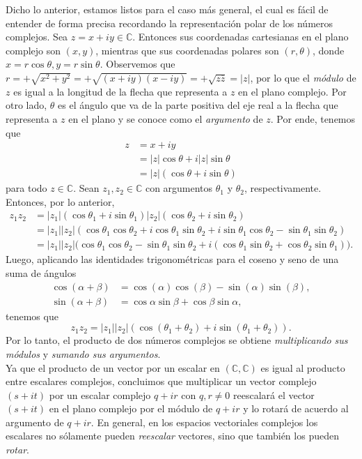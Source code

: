 \documentclass[notasLineal]{subfiles}
\begin{document}
   Dicho lo anterior, estamos listos para el caso más general, el cual es fácil de entender de forma precisa recordando la representación polar de los números complejos. Sea $z=x+iy\in\mathbb{C}$. Entonces sus coordenadas cartesianas en el plano complejo son $(x,y)$, mientras que sus coordenadas polares son $(r,\theta)$, donde $x=r\cos\theta, y = r\sin\theta$. Observemos que $r = +\sqrt{x^2+y^2} = +\sqrt{(x+iy)(x-iy)} = +\sqrt{z \overline{z}} = |z|$, por lo que el \emph{módulo} de $z$ es igual a la longitud de la flecha que representa a $z$ en el plano complejo. Por otro lado, $\theta$ es el ángulo que va de la parte positiva del eje real a la flecha que representa a $z$ en el plano y se conoce como el \emph{argumento} de $z$. Por ende, tenemos que
   \begin{align*}
       z &= x+iy \\
         &= |z|\cos\theta + i|z|\sin\theta \\
         &= |z|(\cos\theta+i\sin\theta)
   \end{align*}
   para todo $z\in\mathbb{C}$. Sean $z_1,z_2\in\mathbb{C}$ con argumentos $\theta_1$ y $\theta_2$, respectivamente. Entonces, por lo anterior,
   \begin{align*}
       z_1z_2 &= |z_1|(\cos\theta_1+i\sin\theta_1)|z_2|(\cos\theta_2+i\sin\theta_2) \\
              &= |z_1||z_2|(\cos\theta_1\cos\theta_2 +i\cos\theta_1\sin\theta_2 + i\sin\theta_1\cos\theta_2-\sin\theta_1\sin\theta_2) \\
              &= |z_1||z_2|\big(\cos\theta_1\cos\theta_2 -\sin\theta_1\sin\theta_2 + i(\cos\theta_1\sin\theta_2+\cos\theta_2\sin\theta_1)\big).
   \end{align*}
   Luego, aplicando las identidades trigonométricas para el coseno y seno de una suma de ángulos
   \begin{align*}
       \cos(\alpha+\beta) &= \cos(\alpha)\cos(\beta)-\sin(\alpha)\sin(\beta), \\
       \sin(\alpha+\beta) &= \cos\alpha\sin\beta + \cos\beta\sin\alpha,
   \end{align*}
   tenemos que
   \[
   z_1z_2 = |z_1||z_2|(\cos(\theta_1+\theta_2) + i\sin(\theta_1+\theta_2)).
   \] 
   Por lo tanto, el producto de dos números complejos se obtiene \emph{multiplicando sus módulos} y \emph{sumando sus argumentos}. \\

   Ya que el producto de un vector por un escalar en $(\mathbb{C},\mathbb{C})$ es igual al producto entre escalares complejos, concluimos que multiplicar un vector complejo $(s+it)$ por un escalar complejo $q+ir$ con $q,r\neq0$ reescalará el vector $(s+it)$ en el plano complejo por el módulo de $q+ir$ y lo rotará de acuerdo al argumento de $q+ir$. En general, en los espacios vectoriales complejos los escalares no sólamente pueden \emph{reescalar} vectores, sino que también los pueden \emph{rotar}. 
\end{document}
